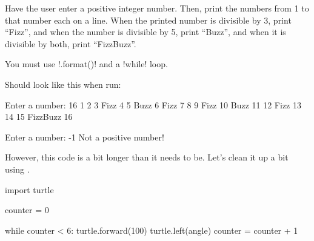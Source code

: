 \documentclass[11pt]{cselabheader}
\begin{document}
\begin{ex}[fizzbuzz.py] Have the user enter a positive integer number. Then,
  print the numbers from 1 to that number each on a line. When the printed
  number is divisible by 3, print ``Fizz'', and when the number is divisible by
  5, print ``Buzz'', and when it is divisible by both, print ``FizzBuzz''.

  You must use \pythoninline!.format()! and a \pythoninline!while! loop.

  Should look like this when run:

  \begin{verbatimcode}
Enter a number: 16
1
2
3 Fizz
4
5 Buzz
6 Fizz
7
8
9 Fizz
10 Buzz
11
12 Fizz
13
14
15 FizzBuzz
16
  \end{verbatimcode}

  \begin{verbatimcode}
Enter a number: -1
Not a positive number!
  \end{verbatimcode}
\end{ex}



%
%
%

However, this code is a bit longer than it needs to be. Let's clean it up a bit using .

\begin{python3code}
import turtle

counter = 0

while counter < 6:
    turtle.forward(100)
    turtle.left(angle)
    counter = counter + 1
\end{python3code}
\end{document}
